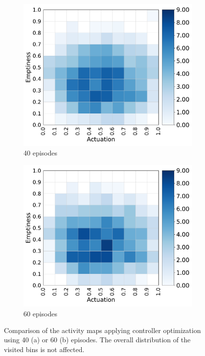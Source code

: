\begin{figure}[H]
    \centering
    \begin{subfigure}[b]{0.49\textwidth}
         \centering
         \includegraphics[scale=0.45]{images/brain_opt/walker/walker_qd_40eps_ag}
         \caption{40 episodes}
         \label{walker_ag_40}
    \end{subfigure}
    \hfill
    \begin{subfigure}[b]{0.49\textwidth}
         \centering
         \includegraphics[scale=0.45]{images/brain_opt/walker/walker_qd_60eps_ag}
         \caption{60 episodes}
         \label{walker_ag_60}
    \end{subfigure}
    \caption{Comparison of the activity maps applying controller optimization using 40 (a) or 60 (b) episodes. The overall distribution of the visited bins is not affected.}
    \label{fig:activity_map}
\end{figure}

